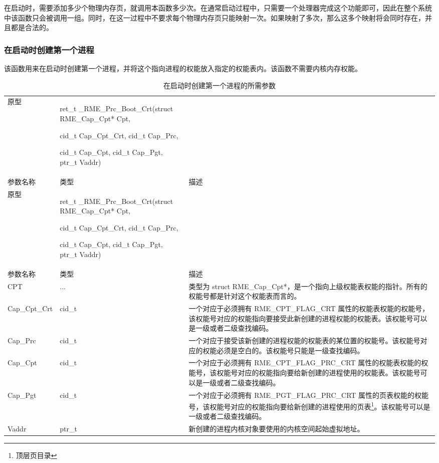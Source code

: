 在启动时，需要添加多少个物理内存页，就调用本函数多少次。在通常启动过程中，只需要一个处理器完成这个功能即可，因此在整个系统中该函数只会被调用一组。同时，在这一过程中不要求每个物理内存页只能映射一次。如果映射了多次，那么这多个映射将会同时存在，并且都是合法的。

\subsubsection{在启动时创建第一个进程}\label{subsubsec:7-create-first-process-at-boot}

该函数用来在启动时创建第一个进程，并将这个指向进程的权能放入指定的权能表内。该函数不需要内核内存权能。

\begin{xltabular}{\textwidth}{@{}>{\hsize\raggedright\arraybackslash}X>{\hsize\raggedright\arraybackslash}X>{\hsize\raggedright\arraybackslash}X@{}}
\caption{在启动时创建第一个进程的所需参数}\label{tab:7-51-create-first-process-at-boot-parameters}\\
\toprule
原型\strut
 & ret\_t \_RME\_Prc\_Boot\_Crt(struct RME\_Cap\_Cpt* Cpt,

cid\_t Cap\_Cpt\_Crt, cid\_t Cap\_Prc,

cid\_t Cap\_Cpt, cid\_t Cap\_Pgt, ptr\_t Vaddr)\strut
 & \strut
\tabularnewline
参数名称 & 类型 & 描述\tabularnewline
\endfirsthead
\toprule
原型\strut
 & ret\_t \_RME\_Prc\_Boot\_Crt(struct RME\_Cap\_Cpt* Cpt,

cid\_t Cap\_Cpt\_Crt, cid\_t Cap\_Prc,

cid\_t Cap\_Cpt, cid\_t Cap\_Pgt, ptr\_t Vaddr)\strut
 & \strut
\tabularnewline
参数名称 & 类型 & 描述\tabularnewline
\midrule
\endhead
\bottomrule
\endlastfoot
CPT & ... &
类型为 struct RME\_Cap\_Cpt*，是一个指向上级权能表权能的指针。所有的权能号都是针对这个权能表而言的。\tabularnewline
Cap\_Cpt\_Crt & cid\_t &
一个对应于必须拥有 RME\_CPT\_FLAG\_CRT 属性的权能表权能的权能号，该权能号对应的权能指向要接受此新创建的进程权能的权能表。该权能号可以是一级或者二级查找编码。\tabularnewline
Cap\_Prc & cid\_t &
一个对应于接受该新创建的进程权能的权能表的某位置的权能号。该权能号对应的权能必须是空白的。该权能号只能是一级查找编码。\tabularnewline
Cap\_Cpt & cid\_t &
一个对应于必须拥有 RME\_CPT\_FLAG\_PRC\_CRT 属性的权能表权能的权能号，该权能号对应的权能指向要给新创建的进程使用的权能表。该权能号可以是一级或者二级查找编码。\tabularnewline
Cap\_Pgt & cid\_t &
一个对应于必须拥有 RME\_PGT\_FLAG\_PRC\_CRT 属性的页表权能的权能号，该权能号对应的权能指向要给新创建的进程使用的页表\footnote{顶层页目录}。该权能号可以是一级或者二级查找编码。\tabularnewline
Vaddr & ptr\_t &
新创建的进程内核对象要使用的内核空间起始虚拟地址。\tabularnewline
\end{xltabular}

